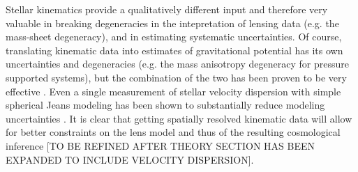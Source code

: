 Stellar kinematics provide a qualitatively different input and
therefore very valuable in breaking degeneracies in the intepretation
of lensing data (e.g. the mass-sheet degeneracy), and in estimating
systematic uncertainties. Of course, translating kinematic data into
estimates of gravitational potential has its own uncertainties and
degeneracies (e.g. the mass anisotropy degeneracy for pressure
supported systems), but the combination of the two has been proven to
be very effective
\citep{T+K04}. Even a single measurement of stellar velocity dispersion
with simple spherical Jeans modeling has been shown to substantially
reduce modeling uncertainties \citep{T+K02,Koo++03,Suy++14}. It is
clear that getting spatially resolved kinematic data will allow for
better constraints on the lens model and thus of the resulting
cosmological inference [TO BE REFINED AFTER THEORY SECTION HAS BEEN
EXPANDED TO INCLUDE VELOCITY DISPERSION].

